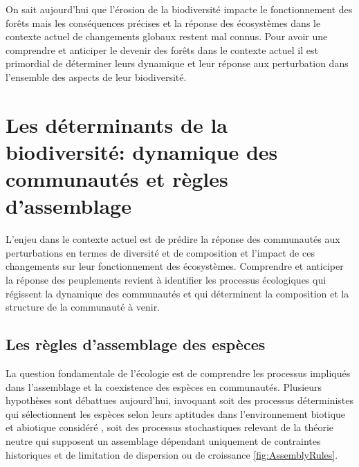 \documentclass[
  11pt,
  french,
  A4paper,
  extrafontsizes,onecolumn,openright
  ]{memoir}
\begin{document}
On sait aujourd'hui que l'érosion de la biodiversité impacte le
fonctionnement des forêts mais les conséquences précises et la réponse
des écosystèmes dans le contexte actuel de changements globaux restent
mal connus. Pour avoir une comprendre et anticiper le devenir des forêts
dans le contexte actuel il est primordial de déterminer leurs dynamique
et leur réponse aux perturbation dans l'ensemble des aspects de leur
biodiversité.

\section{Les déterminants de la biodiversité: dynamique des communautés
et règles
d'assemblage}\label{les-determinants-de-la-biodiversite-dynamique-des-communautes-et-regles-dassemblage}

L'enjeu dans le contexte actuel est de prédire la réponse des
communautés aux perturbations en termes de diversité et de composition
et l'impact de ces changements sur leur fonctionnement des écosystèmes.
Comprendre et anticiper la réponse des peuplements revient à identifier
les processus écologiques qui régissent la dynamique des communautés et
qui déterminent la composition et la structure de la communauté à venir.

\subsection{Les règles d'assemblage des
espèces}\label{les-regles-dassemblage-des-especes}

La question fondamentale de l'écologie est de comprendre les processus
impliqués dans l'assemblage et la coexistence des espèces en
communautés. Plusieurs hypothèses sont débattues aujourd'hui, invoquant
soit des processus déterministes qui sélectionnent les espèces selon
leurs aptitudes dans l'environnement biotique et abiotique considéré
\autocite{Molino2001}, soit des processus stochastiques relevant de la
théorie neutre qui supposent un assemblage dépendant uniquement de
contraintes historiques et de limitation de dispersion ou de croissance
\autocite{Hubbell2001} \ref{fig:AssemblyRules}.
\end{document}
